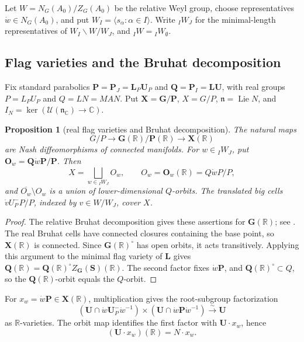 \documentclass[a4paper,12pt]{amsart}
\numberwithin{equation}{section}
\newtheorem{proposition}[theorem]{Proposition}
\theoremstyle{definition}
\theoremstyle{remark}
\newcommand{\G}{\mathbf G}
\newcommand{\Q}{\mathbf Q}
\newcommand{\pP}{\mathbf P}
\newcommand{\lL}{\mathbf L}
\newcommand{\U}{\mathbf U}
\newcommand{\X}{\mathbf X}
\newcommand{\R}{\mathbb R}
\newcommand{\C}{\mathbb C}
\newcommand{\fn}{\mathfrak n}
\newcommand{\IN}{I_N}
\newcommand{\mcU}{\mathcal U}
\newcommand{\Lie}{\operatorname{Lie}}
\newcommand{\sS}{\mathbf S}
\newcommand{\oO}{\mathbf O}
\begin{document}
Let $W=N_G(A_0)/Z_G(A_0)$ be the relative Weyl group, choose representatives $\dot w\in N_G(A_0)$, and put $W_I=\langle s_\alpha:\alpha\in I\rangle$. Write ${}_IW_J$ for the minimal-length representatives of $W_I\backslash W/W_J$, and ${}_IW={}_IW_\emptyset$.

\subsection{Flag varieties and the Bruhat decomposition}\label{ssec:bruhat}

Fix standard parabolics $\pP=\pP_J=\lL_P\U_P$ and $\Q=\pP_I=\lL\U$, with real groups $P=L_PU_P$ and $Q=LN=MAN$. Put $\X=\G/\pP$, $X=G/P$, $\fn=\Lie N$, and $\IN=\ker(\mcU(\fn_\C)\to\C)$.

\begin{proposition}[real flag varieties and Bruhat decomposition]\label{prop:flag-geometry}
The natural maps
\[
 G/P\longrightarrow\G(\R)/\pP(\R)\longrightarrow\X(\R)
\]
are Nash diffeomorphisms of connected manifolds. For $w\in{}_IW_J$, put $\oO_w=\Q\dot w\pP/\pP$. Then
\begin{equation}\label{eq:Bruhat}
 X=\bigsqcup_{w\in{}_IW_J}O_w,\qquad
 O_w=\oO_w(\R)=Q\dot wP/P,
\end{equation}
and $\overline{O_w}\setminus O_w$ is a union of lower-dimensional $Q$-orbits. The translated big cells $\dot vU_P^-P/P$, indexed by $v\in W/W_J$, cover $X$.
\end{proposition}
\begin{proof}
The relative Bruhat decomposition gives these assertions for $\G(\R)$; see \cite[\S3.2, Theorem~3.13, Corollary~3.15 and Proposition~3.16]{BT72}. The real Bruhat cells have connected closures containing the base point, so $\X(\R)$ is connected. Since $\G(\R)^\circ$ has open orbits, it acts transitively. Applying this argument to the minimal flag variety of $\lL$ gives $\Q(\R)=\Q(\R)^\circ Z_\G(\sS)(\R)$. The second factor fixes $\dot w\pP$, and $\Q(\R)^\circ\subset Q$, so the $\Q(\R)$-orbit equals the $Q$-orbit.
\end{proof}

For $x_w=\dot w\pP\in\X(\R)$, multiplication gives the root-subgroup factorization
\begin{equation}\label{eq:N-factorization}
 (\U\cap\dot w\U_P^-\dot w^{-1})\times
 (\U\cap\dot w\pP\dot w^{-1})\xrightarrow{\ \sim\ }\U
\end{equation}
as $\R$-varieties. The orbit map identifies the first factor with $\U\cdot x_w$, hence
\begin{equation}\label{eq:N-orbit-real-points}
 (\U\cdot x_w)(\R)=N\cdot x_w.
\end{equation}
\end{document}
